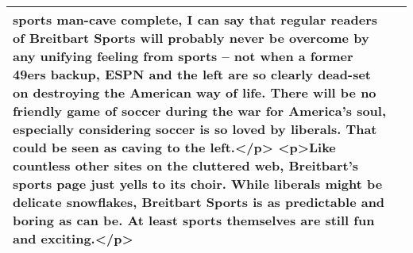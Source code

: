 \documentclass[]{article}
\begin{document}
\begin{table}[!h]
{\begin{tabular}[t]{ll}
sports man-cave complete, I can say that regular readers of Breitbart Sports will probably never be overcome by any unifying feeling from sports – not when a former 49ers backup, ESPN and the left are so clearly dead-set on destroying the American way of life. There will be no friendly game of soccer during the war for America’s soul, especially considering soccer is so loved by liberals. That could be seen as caving to the left.</p> <p>Like countless other sites on the cluttered web, Breitbart’s sports page just yells to its choir. While liberals might be delicate snowflakes, Breitbart Sports is as predictable and boring as can be. At least sports themselves are still fun and exciting.</p>\\
\bottomrule
\end{tabular}}
\end{table}


\end{document}
